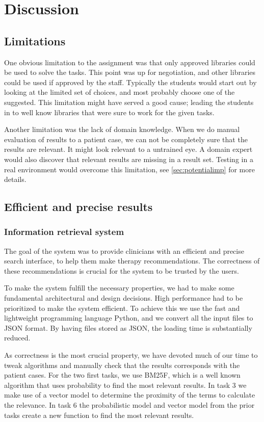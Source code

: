 \chapter{Discussion}
\label{cha:discussion}

\section{Limitations}
One obvious limitation to the assignment was that only approved libraries could be used to solve the tasks. This point was up for negotiation, and other libraries could be used if approved by the staff. Typically the students would start out by looking at the limited set of choices, and most probably choose one of the suggested. This limitation might have served a good cause; leading the students in to well know libraries that were sure to work for the given tasks.

Another limitation was the lack of domain knowledge. When we do manual evaluation of results to a patient case, we can not be completely sure that the results are relevant. It might look relevant to a untrained eye. A domain expert would also discover that relevant results are missing in a result set. Testing in a real environment would overcome this limitation, see \autoref{sec:potentialimp} for more details.

\section{Efficient and precise results}
\subsection{Information retrieval system}
The goal of the system was to provide clinicians with an efficient and precise search interface, to help them make therapy recommendations. The correctness of these recommendations is crucial for the system to be trusted by the users.

To make the system fulfill the necessary properties, we had to make some fundamental architectural and design decisions.
High performance had to be prioritized to make the system efficient. To achieve this we use the fast and lightweight programming language Python, and we convert all the input files to JSON format. By having files stored as JSON, the loading time is substantially reduced.

As correctness is the most crucial property, we have devoted much of our time to tweak algorithms and manually check that the results corresponds with the patient cases. For the two first tasks, we use BM25F, which is a well known algorithm that uses probability to find the most relevant results. In task 3 we make use of a vector model to determine the proximity of the terms to calculate the relevance. In task 6 the probabilistic model and vector model from the prior tasks create a new function to find the most relevant results.    

